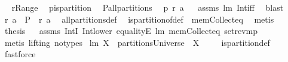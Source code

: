 \begin{isabellebody}
%
\isadelimproof
%
\endisadelimproof
%
\isatagproof
{}\isamarkupfalse%
\ {\isacharminus}\isanewline
{}\isamarkupfalse%
\ {\isacharquery}r{\isacharequal}Range\ \isamarkupfalse%
\ {\isacharquery}p{\isacharequal}is{\isacharunderscore}partition\ \isamarkupfalse%
\ {\isacharquery}P{\isacharequal}all{\isacharunderscore}partitions\ \isamarkupfalse%
\ {\isachardoublequoteopen}{\isacharquery}p\ {\isacharparenleft}{\isacharquery}r\ a{\isacharparenright}{\isachardoublequoteclose}\ \isamarkupfalse%
\ \isanewline
assms\ lm{}{}\ Int{\isacharunderscore}iff\ \isamarkupfalse%
\ blast\ \isamarkupfalse%
\ \isamarkupfalse%
\ {\isachardoublequoteopen}{\isacharquery}r\ a\ {\isasymin}\ {\isacharquery}P\ {\isacharparenleft}{\isasymUnion}\ {\isacharparenleft}{\isacharquery}r\ a{\isacharparenright}{\isacharparenright}{\isachardoublequoteclose}\ \isamarkupfalse%
\ all{\isacharunderscore}partitions{\isacharunderscore}def\ \isanewline
{}\isamarkupfalse%
\ is{\isacharunderscore}partition{\isacharunderscore}of{\isacharunderscore}def\ \ mem{\isacharunderscore}Collect{\isacharunderscore}eq\ \isamarkupfalse%
\ {\isacharparenleft}metis{\isacharparenright}\ \isamarkupfalse%
\ \isamarkupfalse%
\ {\isacharquery}thesis\ \isamarkupfalse%
\ \isanewline
assms\ IntI\ Int{\isacharunderscore}lower{}\ equalityE\ lm{}{}\ mem{\isacharunderscore}Collect{\isacharunderscore}eq\ set{\isacharunderscore}rev{\isacharunderscore}mp\ \isamarkupfalse%
\ {\isacharparenleft}metis\ {\isacharparenleft}lifting{\isacharcomma}\ no{\isacharunderscore}types{\isacharparenright}{\isacharparenright}\isanewline
{}\isamarkupfalse%
%
\endisatagproof
{\isafoldproof}%
%
\isadelimproof
\isanewline
%
\endisadelimproof
\isanewline
{}\isamarkupfalse%
\ lm{}{}{\isacharcolon}\ {\isachardoublequoteopen}{\isacharbraceleft}X{\isacharbraceright}\ {\isasymin}\ partitionsUniverse\ {\isacharequal}\ {\isacharparenleft}X\ {\isasymnoteq}\ {\isacharbraceleft}{\isacharbraceright}{\isacharparenright}{\isachardoublequoteclose}%
\isadelimproof
\ %
\endisadelimproof
%
\isatagproof
{}\isamarkupfalse%
\ is{\isacharunderscore}partition{\isacharunderscore}def\ \isamarkupfalse%
\ fastforce%
\endisatagproof
{\isafoldproof}%
%
\isadelimproof
%
\endisadelimproof

\end{isabellebody}
